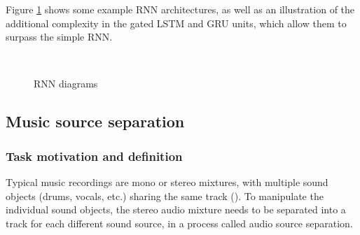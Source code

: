 \documentclass[report.tex]{subfiles}
\begin{document}
Figure \ref{fig:rnndiags} shows some example RNN architectures, as well as an illustration of the additional complexity in the gated LSTM and GRU units, which allow them to surpass the simple RNN.

\begin{figure}[ht]
	\centering
	\hspace{0.1em}
	\\
	\caption{RNN diagrams}
	\label{fig:rnndiags}
\end{figure}

\newpagefill

\subsection{Music source separation}
\label{sec:musicsep}

\subsubsection{Task motivation and definition}

Typical music recordings are mono or stereo mixtures, with multiple sound objects (drums, vocals, etc.) sharing the same track (\cite{musicsepintro1}). To manipulate the individual sound objects, the stereo audio mixture needs to be separated into a track for each different sound source, in a process called audio source separation.
\end{document}
